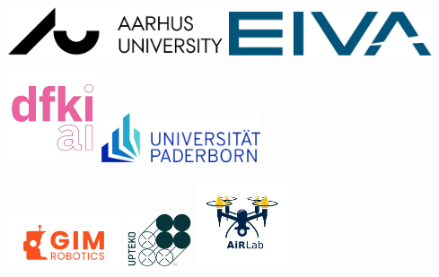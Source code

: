 \begin{center}

\includegraphics[width=0.48\textwidth, valign=c]{figs/logos/AUblack.pdf}
\hspace{5ex}
\includegraphics[width=0.45\textwidth, valign=c]{figs/logos/eivalogo.png}

\vspace{5ex}

\includegraphics[width=0.2\textwidth, valign=c]{Phd_thesis/figs/logos/dfki.png}
\hspace{14ex}
\includegraphics[width=0.35\textwidth, valign=c]{Phd_thesis/figs/logos/pad.png}


\vspace{2ex}

\includegraphics[width=0.25\textwidth, valign=c]{figs/logos/gim.jpg}
\hfill
\includegraphics[width=0.15\textwidth, valign=c]{Phd_thesis/figs/logos/upteko.png}
\hfill
\includegraphics[width=0.20\textwidth, valign=c]{Phd_thesis/figs/logos/airlab.jpg}



\end{center}
